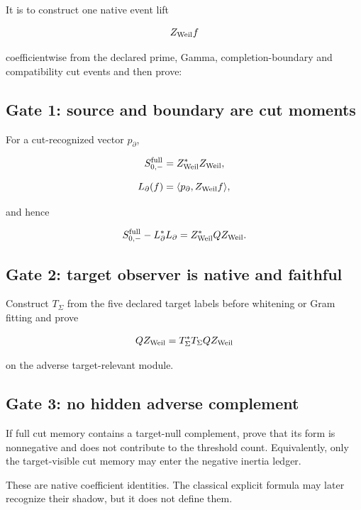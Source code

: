 It is to construct one native event lift

\[
Z_{\rm Weil}f
\]

coefficientwise from the declared prime, Gamma, completion-boundary and
compatibility cut events and then prove:

\hypertarget{gate-1-source-and-boundary-are-cut-moments}{%
\subsection{Gate 1: source and boundary are cut moments}\label{gate-1-source-and-boundary-are-cut-moments}}

For a cut-recognized vector \(p_\partial\),

\[
S_{0,-}^{\rm full}=Z_{\rm Weil}^*Z_{\rm Weil},
\]

\[
L_\partial(f)=\langle p_\partial,Z_{\rm Weil}f\rangle,
\]

and hence

\[
S_{0,-}^{\rm full}-L_\partial^*L_\partial
=Z_{\rm Weil}^*QZ_{\rm Weil}.
\]

\hypertarget{gate-2-target-observer-is-native-and-faithful}{%
\subsection{Gate 2: target observer is native and faithful}\label{gate-2-target-observer-is-native-and-faithful}}

Construct \(T_\Sigma\) from the five declared target labels before whitening or
Gram fitting and prove

\[
QZ_{\rm Weil}
=T_\Sigma^*T_\Sigma QZ_{\rm Weil}
\]

on the adverse target-relevant module.

\hypertarget{gate-3-no-hidden-adverse-complement}{%
\subsection{Gate 3: no hidden adverse complement}\label{gate-3-no-hidden-adverse-complement}}

If full cut memory contains a target-null complement, prove that its form is
nonnegative and does not contribute to the threshold count. Equivalently,
only the target-visible cut memory may enter the negative inertia ledger.

These are native coefficient identities. The classical explicit formula may
later recognize their shadow, but it does not define them.

